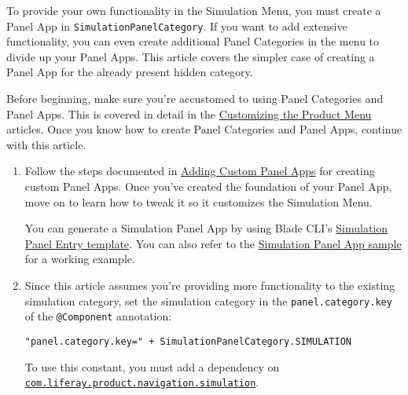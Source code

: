 To provide your own functionality in the Simulation Menu, you must
create a Panel App in \texttt{SimulationPanelCategory}. If you want to
add extensive functionality, you can even create additional Panel
Categories in the menu to divide up your Panel Apps. This article covers
the simpler case of creating a Panel App for the already present hidden
category.

Before beginning, make sure you're accustomed to using Panel Categories
and Panel Apps. This is covered in detail in the
\href{/docs/7-2/customization/-/knowledge_base/c/customizing-the-product-menu}{Customizing
the Product Menu} articles. Once you know how to create Panel Categories
and Panel Apps, continue with this article.

\begin{enumerate}
\def\labelenumi{\arabic{enumi}.}
\item
  Follow the steps documented in
  \href{/docs/7-2/customization/-/knowledge_base/c/adding-custom-panel-apps}{Adding
  Custom Panel Apps} for creating custom Panel Apps. Once you've created
  the foundation of your Panel App, move on to learn how to tweak it so
  it customizes the Simulation Menu.

  You can generate a Simulation Panel App by using Blade CLI's
  \href{/docs/7-2/reference/-/knowledge_base/r/simulation-panel-entry-template}{Simulation
  Panel Entry template}. You can also refer to the
  \href{/docs/7-2/reference/-/knowledge_base/r/simulation-panel-app}{Simulation
  Panel App sample} for a working example.
\item
  Since this article assumes you're providing more functionality to the
  existing simulation category, set the simulation category in the
  \texttt{panel.category.key} of the \texttt{@Component} annotation:

\begin{verbatim}
"panel.category.key=" + SimulationPanelCategory.SIMULATION
\end{verbatim}

  To use this constant, you must add a dependency on
  \href{https://repository.liferay.com/nexus/content/repositories/liferay-public-releases/com/liferay/com.liferay.product.navigation.simulation/}{\texttt{com.liferay.product.navigation.simulation}}.


\end{enumerate}
